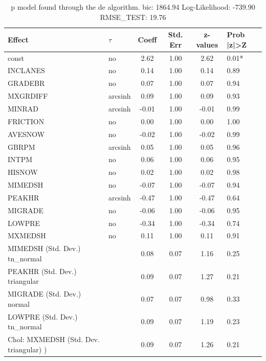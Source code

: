 \begin{table}
	\caption{p model found through the de algorithm. bic: 1864.94 Log-Likelihood: -739.90 RMSE_TEST: 19.76}
	\begin{center}
		\begin{tabular}{|l|l|c|c|c|l|}
			\hline
			Effect & $\tau$ & Coeff & Std. Err & z-values & Prob |z|>Z \\
			\hline
			const & no & 2.62 & 1.00 & 2.62 & 0.01* \\
			\hline
			INCLANES & no & 0.14 & 1.00 & 0.14 & 0.89 \\
			\hline
			GRADEBR & no & 0.07 & 1.00 & 0.07 & 0.94 \\
			\hline
			MXGRDIFF & arcsinh & 0.09 & 1.00 & 0.09 & 0.93 \\
			\hline
			MINRAD & arcsinh & -0.01 & 1.00 & -0.01 & 0.99 \\
			\hline
			FRICTION & no & 0.00 & 1.00 & 0.00 & 1.00 \\
			\hline
			AVESNOW & no & -0.02 & 1.00 & -0.02 & 0.99 \\
			\hline
			GBRPM & arcsinh & 0.05 & 1.00 & 0.05 & 0.96 \\
			\hline
			INTPM & no & 0.06 & 1.00 & 0.06 & 0.95 \\
			\hline
			HISNOW & no & 0.02 & 1.00 & 0.02 & 0.98 \\
			\hline
			MIMEDSH & no & -0.07 & 1.00 & -0.07 & 0.94 \\
			\hline
			PEAKHR & arcsinh & -0.47 & 1.00 & -0.47 & 0.64 \\
			\hline
			MIGRADE & no & -0.06 & 1.00 & -0.06 & 0.95 \\
			\hline
			LOWPRE & no & -0.34 & 1.00 & -0.34 & 0.74 \\
			\hline
			MXMEDSH & no & 0.11 & 1.00 & 0.11 & 0.91 \\
			\hline
			MIMEDSH (Std. Dev.) tn_normal &  & 0.08 & 0.07 & 1.16 & 0.25 \\
			\hline
			PEAKHR (Std. Dev.) triangular &  & 0.09 & 0.07 & 1.27 & 0.21 \\
			\hline
			MIGRADE (Std. Dev.) normal &  & 0.07 & 0.07 & 0.98 & 0.33 \\
			\hline
			LOWPRE (Std. Dev.) tn_normal &  & 0.09 & 0.07 & 1.19 & 0.23 \\
			\hline
			 Chol: MXMEDSH (Std. Dev. triangular) ) &  & 0.09 & 0.07 & 1.26 & 0.21 \\
			\hline
		\end{tabular}
	\end{center}
\end{table}